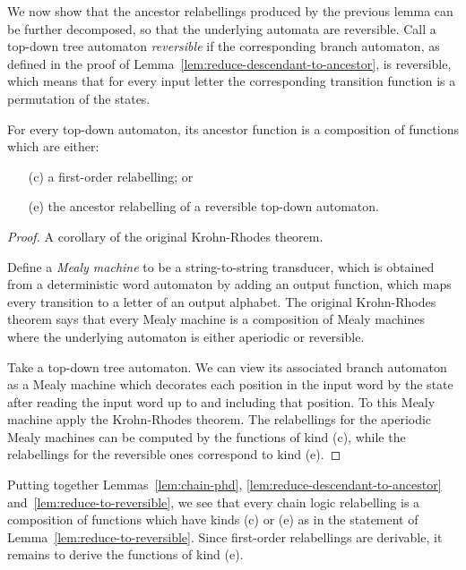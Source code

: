 We now show that the ancestor relabellings produced by the previous lemma can be further decomposed, so that the underlying automata are reversible. 
Call a top-down tree automaton \emph{reversible} if the corresponding branch automaton, as defined in the proof of Lemma~\ref{lem:reduce-descendant-to-ancestor}, is reversible, which means that for every input letter the corresponding transition function is a permutation of the states. 
\begin{lemma}\label{lem:reduce-to-reversible}
    For every  top-down automaton, its ancestor function is a composition of functions which are either:
    \begin{itemize}
        \item[(c)] a first-order relabelling; or 
        \item[(e)] the ancestor relabelling of a reversible top-down automaton.
    \end{itemize}  
\end{lemma}
\begin{proof}
    A corollary of the original Krohn-Rhodes theorem. 
    
    Define a \emph{Mealy machine} to be a string-to-string transducer, which is obtained from a deterministic word automaton by adding an output function, which maps every transition to a letter of an output alphabet.  The original Krohn-Rhodes theorem says that every Mealy machine is a composition of Mealy machines where the underlying automaton is either aperiodic or reversible.  
    
    Take a top-down tree automaton. We can view its associated branch automaton  as a Mealy machine  which decorates each position in the input word by the state after reading the input word up to and including that position. To this Mealy machine apply the Krohn-Rhodes theorem. The relabellings for the aperiodic Mealy machines can be computed by the functions of kind (c), while the relabellings for the reversible ones correspond to kind (e).
\end{proof}

Putting together Lemmas~\ref{lem:chain-phd}, \ref{lem:reduce-descendant-to-ancestor} and~\ref{lem:reduce-to-reversible}, we see that every chain logic relabelling is a composition of functions which have kinds (c) or (e) as in the statement of Lemma~\ref{lem:reduce-to-reversible}. Since first-order relabellings are derivable, it remains to derive the functions of kind (e). 


